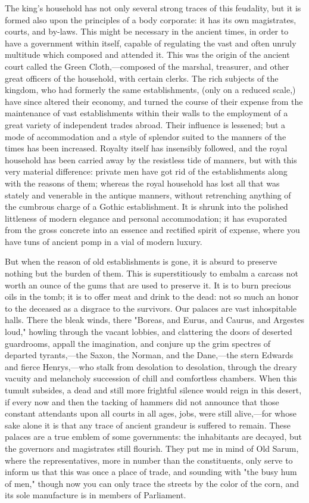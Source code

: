 The king's household has not only several strong traces of this feudality, but it is formed also upon the principles of a body corporate: it has its own magistrates, courts, and by-laws. This might be necessary in the ancient times, in order to have a government within itself, capable of regulating the vast and often unruly multitude which composed and attended it. This was the origin of the ancient court called the Green Cloth,—composed of the marshal, treasurer, and other great officers of the household, with certain clerks. The rich subjects of the kingdom, who had formerly the same establishments, (only on a reduced scale,) have since altered their economy, and turned the course of their expense from the maintenance of vast establishments within their walls to the employment of a great variety of independent trades abroad. Their influence is lessened; but a mode of accommodation and a style of splendor suited to the manners of the times has been increased. Royalty itself has insensibly followed, and the royal household has been carried away by the resistless tide of manners, but with this very material difference: private men have got rid of the establishments along with the reasons of them; whereas the royal household has lost all that was stately and venerable in the antique manners, without retrenching anything of the cumbrous charge of a Gothic establishment. It is shrunk into the polished littleness of modern elegance and personal accommodation; it has evaporated from the gross concrete into an essence and rectified spirit of expense, where you have tuns of ancient pomp in a vial of modern luxury.

But when the reason of old establishments is gone, it is absurd to preserve nothing but the burden of them. This is superstitiously to embalm a carcass not worth an ounce of the gums that are used to preserve it. It is to burn precious oils in the tomb; it is to offer meat and drink to the dead: not so much an honor to the deceased as a disgrace to the survivors. Our palaces are vast inhospitable halls. There the bleak winds, there "Boreas, and Eurus, and Caurus, and Argestes loud," howling through the vacant lobbies, and clattering the doors of deserted guardrooms, appall the imagination, and conjure up the grim spectres of departed tyrants,—the Saxon, the Norman, and the Dane,—the stern Edwards and fierce Henrys,—who stalk from desolation to desolation, through the dreary vacuity and melancholy succession of chill and comfortless chambers. When this tumult subsides, a dead and still more frightful silence would reign in this desert, if every now and then the tacking of hammers did not announce that those constant attendants upon all courts in all ages, jobs, were still alive,—for whose sake alone it is that any trace of ancient grandeur is suffered to remain. These palaces are a true emblem of some governments: the inhabitants are decayed, but the governors and magistrates still flourish. They put me in mind of Old Sarum, where the representatives, more in number than the constituents, only serve to inform us that this was once a place of trade, and sounding with "the busy hum of men," though now you can only trace the streets by the color of the corn, and its sole manufacture is in members of Parliament.


